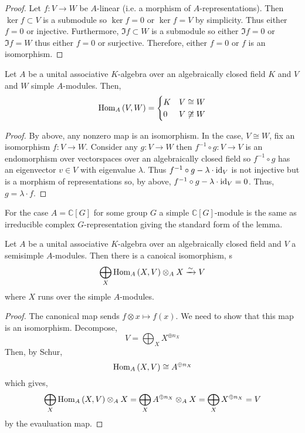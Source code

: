\documentclass[12pt]{article}
\newcommand{\C}{\mathbb{C}}
\begin{document}
\begin{proof}
Let $f : V \to W$ be $A$-linear (i.e. a morphism of $A$-representations). Then $\ker{f} \subset V$ is a submodule so $\ker{f} = 0$ or $\ker{f} = V$ by simplicity. Thus either $f = 0$ or injective. Furthermore, $\Im{f} \subset W$ is a submodule so either $\Im{f} = 0$ or $\Im{f} = W$ thus either $f = 0$ or surjective. Therefore, either $f = 0$ or $f$ is an isomorphism.
\end{proof}

\begin{lemma}[Schur]
Let $A$ be a unital associative $K$-algebra over an algebraically closed field $K$ and $V$ and $W$ simple $A$-modules. Then,
\[ \mathrm{Hom}_{A} \left( V, W \right) = 
\begin{cases}
K & V \cong W
\\
0 & V \not\cong W
\end{cases} \]
\end{lemma}

\begin{proof}
By above, any nonzero map is an isomorphism.
In the case, $V \cong W$, fix an isomorphism $f : V \to W$. Consider any $g : V \to W$ then $f^{-1} \circ g : V \to V$ is an endomorphism over vectorspaces over an algebraically closed field so $f^{-1} \circ g$ has an eigenvector $v \in V$ with eigenvalue $\lambda$. Thus $f^{-1} \circ g - \lambda \cdot \mathrm{id}_V$ is not injective but is a morphism of representations so, by above, $f^{-1} \circ g - \lambda \cdot \mathrm{id}_V = 0$. Thus, $g = \lambda \cdot f$. 
\end{proof}


\begin{remark}
For the case $A = \C[G]$ for some group $G$ a simple $\C[G]$-module is the same as irreducible complex $G$-representation giving the standard form of the lemma. 
\end{remark}

\begin{corollary}
Let $A$ be a unital associative $K$-algebra over an algebraically closed field and $V$  a semisimple $A$-modules. Then there is a canoical isomorphism,
s\[ \bigoplus_X \mathrm{Hom}_{A} \left( X, V \right) \otimes_A X \xrightarrow{\sim} V \] 
where $X$ runs over the simple $A$-modules.
\end{corollary}

\begin{proof}
The canonical map sends $f \otimes x \mapsto f(x)$. We need to show that this map is an isomorphism. Decompose,
\[ V = \bigoplus_{X} X^{\oplus n_X} \]
Then, by Schur,
\[ \mathrm{Hom}_{A} \left( X, V \right) \cong A^{\oplus n_X} \] 
which gives,
\[ \bigoplus_X \mathrm{Hom}_{A} \left( X, V \right) \otimes_A X = \bigoplus_X A^{\oplus n_X} \otimes_A X = \bigoplus_X X^{\oplus n_X}  = V \]
by the evauluation map. 
\end{proof}
\end{document}
